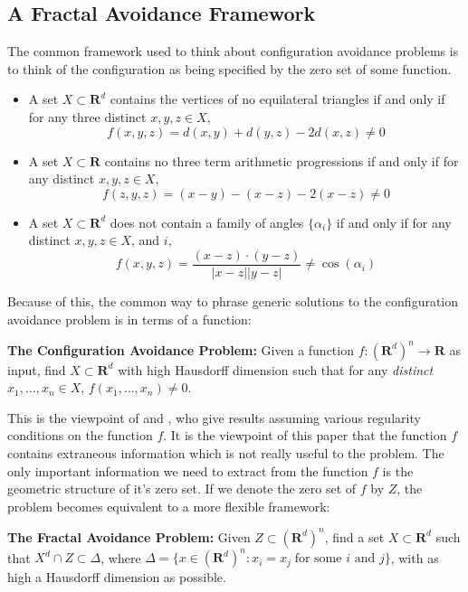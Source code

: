 \documentclass{article}
\theoremstyle{plain}
\theoremstyle{plain}
\begin{document}
\begin{multicols}{2}
\section{A Fractal Avoidance Framework}

The common framework used to think about configuration avoidance problems is to think of the configuration as being specified by the zero set of some function.
%
\begin{itemize}
	\item A set $X \subset \mathbf{R}^d$ contains the vertices of no equilateral triangles if and only if for any three distinct $x,y,z \in X$,
	\[ f(x,y,z) = d(x,y) + d(y,z) - 2d(x,z) \neq 0 \]

	\item A set $X \subset \mathbf{R}$ contains no three term arithmetic progressions if and only if for any distinct $x,y,z \in X$,
	\[ f(z,y,z) = (x - y) - (x - z) - 2(x - z) \neq 0 \]

	\item A set $X \subset \mathbf{R}^d$ does not contain a family of angles $\{ \alpha_i \}$ if and only if for any distinct $x,y,z \in X$, and $i$,
	\[ f(x,y,z) = \frac{(x - z) \cdot (y - z)}{|x - z||y - z|} \neq \cos(\alpha_i) \]
\end{itemize}
%
Because of this, the common way to phrase generic solutions to the configuration avoidance problem is in terms of a function:

\begin{changemargin}{0.5em}{0em}
{\bf The Configuration Avoidance Problem:} Given a function $f: (\mathbf{R}^d)^n \to \mathbf{R}$ as input, find $X \subset \mathbf{R}^d$ with high Hausdorff dimension such that for any {\it distinct} $x_1, \dots, x_n \in X$, $f(x_1, \dots, x_n) \neq 0$.
\end{changemargin}

This is the viewpoint of \cite{MalabikaRob} and \cite{Mathe}, who give results assuming various regularity conditions on the function $f$. It is the viewpoint of this paper that the function $f$ contains extraneous information which is not really useful to the problem. The only important information we need to extract from the function $f$ is the geometric structure of it's zero set. If we denote the zero set of $f$ by $Z$, the problem becomes equivalent to a more flexible framework:

\begin{changemargin}{0.5em}{0em}
	{\bf The Fractal Avoidance Problem:} Given $Z \subset (\mathbf{R}^d)^n$, find a set $X \subset \mathbf{R}^d$ such that $X^d \cap Z \subset \Delta$, where $\Delta = \{ x \in (\mathbf{R}^d)^n : x_i = x_j\; \text{for some $i$ and $j$} \}$, with as high a Hausdorff dimension as possible.
\end{changemargin}


\end{multicols}
\end{document}
